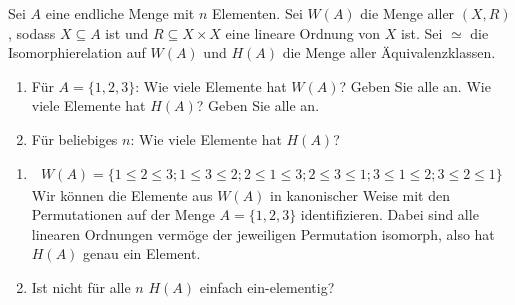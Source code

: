 
\begin{exercise}[281]

Sei $A$ eine endliche Menge mit $n$ Elementen. Sei $W(A)$ die Menge aller $(X,R)$,
sodass $X \subseteq A$ ist und $R \subseteq X \times X$ eine lineare Ordnung von $X$
ist. Sei $\simeq$ die Isomorphierelation auf $W(A)$ und $H(A)$ die Menge aller
Äquivalenzklassen.

\begin{enumerate}[label = \alph*.]
  \item Für $A = \{1,2,3\}$: Wie viele Elemente hat $W(A)$? Geben Sie alle an.
  Wie viele Elemente hat $H(A)$? Geben Sie alle an.
  \item Für beliebiges $n$: Wie viele Elemente hat $H(A)$?
\end{enumerate}

\end{exercise}


\begin{solution}

\phantom{}

\begin{enumerate}[label = \alph*.]
  \item
  \begin{align*}
    W(A)
    = \{ 1 \leq 2 \leq 3; 1 \leq 3 \leq 2; 2 \leq 1 \leq 3; 2 \leq 3 \leq 1;
    3 \leq 1 \leq 2; 3 \leq 2 \leq 1\}
  \end{align*}
  Wir können die Elemente aus $W(A)$ in kanonischer Weise mit den
  Permutationen auf der Menge $A = \{1,2,3\}$ identifizieren.
  Dabei sind alle linearen Ordnungen vermöge der jeweiligen Permutation
  isomorph, also hat $H(A)$ genau ein Element.
  \item Ist nicht für alle $n$ $H(A)$ einfach ein-elementig?
\end{enumerate}

\end{solution}

